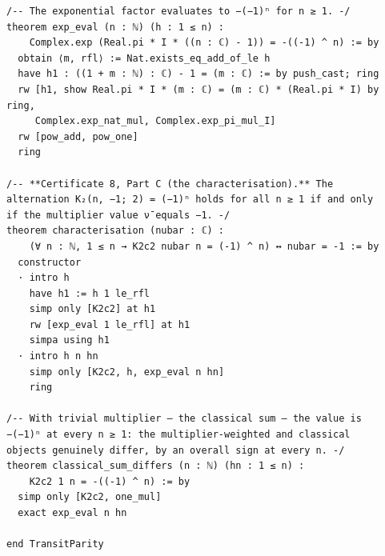 \documentclass[11pt,a4paper]{article}
\theoremstyle{plain}
\theoremstyle{definition}
\theoremstyle{remark}
\begin{document}
\begin{Verbatim}[fontsize=\footnotesize,breaklines=true,breakanywhere=true,formatcom=\leanmono]
/-- The exponential factor evaluates to −(−1)ⁿ for n ≥ 1. -/
theorem exp_eval (n : ℕ) (h : 1 ≤ n) :
    Complex.exp (Real.pi * I * ((n : ℂ) - 1)) = -((-1) ^ n) := by
  obtain ⟨m, rfl⟩ := Nat.exists_eq_add_of_le h
  have h1 : ((1 + m : ℕ) : ℂ) - 1 = (m : ℂ) := by push_cast; ring
  rw [h1, show Real.pi * I * (m : ℂ) = (m : ℂ) * (Real.pi * I) by ring,
     Complex.exp_nat_mul, Complex.exp_pi_mul_I]
  rw [pow_add, pow_one]
  ring

/-- **Certificate 8, Part C (the characterisation).** The
alternation K₂(n, −1; 2) = (−1)ⁿ holds for all n ≥ 1 if and only
if the multiplier value ν̄ equals −1. -/
theorem characterisation (nubar : ℂ) :
    (∀ n : ℕ, 1 ≤ n → K2c2 nubar n = (-1) ^ n) ↔ nubar = -1 := by
  constructor
  · intro h
    have h1 := h 1 le_rfl
    simp only [K2c2] at h1
    rw [exp_eval 1 le_rfl] at h1
    simpa using h1
  · intro h n hn
    simp only [K2c2, h, exp_eval n hn]
    ring

/-- With trivial multiplier — the classical sum — the value is
−(−1)ⁿ at every n ≥ 1: the multiplier-weighted and classical
objects genuinely differ, by an overall sign at every n. -/
theorem classical_sum_differs (n : ℕ) (hn : 1 ≤ n) :
    K2c2 1 n = -((-1) ^ n) := by
  simp only [K2c2, one_mul]
  exact exp_eval n hn

end TransitParity
\end{Verbatim}
\end{document}
